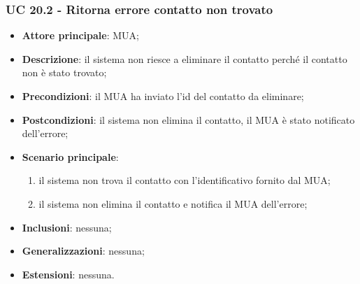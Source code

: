     \subsubsection{UC 20.2 - Ritorna errore contatto non trovato} \label{sec:UC20.2}
    \begin{itemize}
        \item \textbf{Attore principale}: MUA;
        \item \textbf{Descrizione}: il sistema non riesce a eliminare il contatto perché il contatto non è stato trovato;
        \item \textbf{Precondizioni}: il MUA ha inviato l'id del contatto da eliminare;
        \item \textbf{Postcondizioni}: il sistema non elimina il contatto, il MUA è stato notificato dell'errore;
        \item \textbf{Scenario principale}:
            \begin{enumerate}
                \item il sistema non trova il contatto con l'identificativo fornito dal MUA;
                \item il sistema non elimina il contatto e notifica il MUA dell'errore;
            \end{enumerate}
        \item \textbf{Inclusioni}: nessuna;
        \item \textbf{Generalizzazioni}: nessuna;
        \item \textbf{Estensioni}: nessuna.
    \end{itemize}

